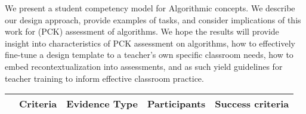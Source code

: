 We present a student competency model for Algorithmic concepts. We describe our design approach, provide examples of tasks, and consider implications of this work for (PCK) assessment of algorithms. We hope the results will provide insight into characteristics of PCK assessment on algorithms, how to effectively fine-tune a design template to a teacher's own specific classroom needs, how to embed recontextualization into assessments, and as such yield guidelines for teacher training to inform effective classroom practice.


\begin{table}
  \centering
\begin{tabular}{|c|p{30mm}|p{33mm}|p{30mm}|p{43mm}|}
   \hline
   & \textbf{Criteria} & \textbf{Evidence Type} & \textbf{Participants} & \textbf{Success criteria}\\
  \hline


\end{tabular}
\end{table}

